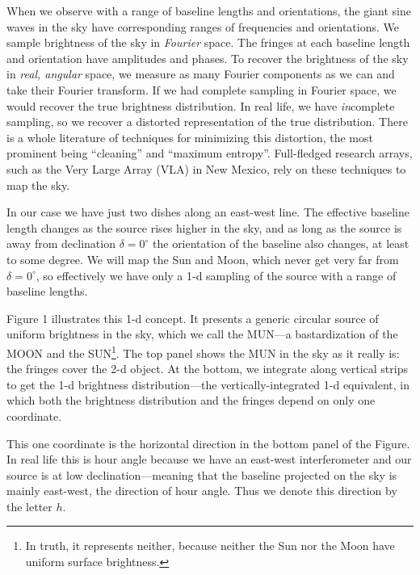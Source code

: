 \documentclass[11pt,preprint]{aastex}
\begin{document}
	When we observe with a range of baseline lengths and
orientations, the giant sine waves in the sky have corresponding ranges
of frequencies and orientations. We sample brightness of the sky in {\it
Fourier} space. The fringes at each baseline length and orientation have
amplitudes and phases. To recover the brightness of the sky in {\it
real, angular} space, we measure as many Fourier components as we can
and take their Fourier transform. If we had complete sampling in Fourier
space, we would recover the true brightness distribution. In real life,
we have {\it in}complete sampling, so we recover a distorted
representation of the true distribution. There is a whole literature 
of techniques for minimizing this distortion, the most prominent being
``cleaning'' and ``maximum entropy''. Full-fledged research arrays, such
as the Very Large Array (VLA) in New Mexico, rely on these techniques to
map the sky.

	In our case we have just two dishes along an east-west line. The
effective baseline length changes as the source rises higher in the sky,
and as long as the source is away from declination $\delta = 0^\circ$ the
orientation of the baseline also changes, at least to some degree. We
will map the Sun and Moon, which never get very far from $\delta =
0^\circ$, so effectively we have only a 1-d sampling of the source with
a range of baseline lengths. 

	Figure 1 illustrates this 1-d concept. It presents a generic
circular  source of uniform brightness in the sky, which we call the
MUN---a bastardization of the MOON and the SUN\footnote{In truth, it
represents neither, because neither the Sun nor the Moon have uniform
surface brightness.}. The top panel shows the MUN in the sky as it
really is: the fringes cover the 2-d object. At the bottom, we integrate
along vertical strips to get the 1-d brightness distribution---the
vertically-integrated 1-d equivalent, in which both the brightness
distribution and the fringes depend on only one coordinate. 

	This one coordinate is the horizontal direction in the bottom
panel of the Figure. In real life this is hour angle because we have an
east-west interferometer and our source is at low declination---meaning
that the baseline projected on the sky is mainly east-west, the
direction of hour angle. Thus we denote this direction by the letter
$h$. 
\end{document}
